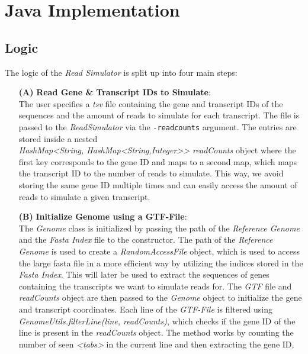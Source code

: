 \documentclass[12pt]{article}
\begin{document}

\section{Java Implementation}
\subsection{Logic}\label{sec:logic}
The logic of the \textit{Read Simulator} is split up into four main steps:
\begin{enumerate}
	\item[\textbf{(A)}] \textbf{Read Gene \& Transcript IDs to Simulate}:\\
		The user specifies a \textit{tsv} file containing the gene and transcript IDs of the sequences and the
		amount of reads to simulate for each transcript. The file is passed to the \textit{ReadSimulator}
		via the \texttt{-readcounts} argument. The entries are stored inside a nested \\
		\textit{HashMap<String, HashMap<String,Integer>\hspace{0.1mm}> readCounts} object where
		the first key corresponds to the gene ID and maps to a second map, which maps the transcript ID to the number of reads to simulate.
		This way, we avoid storing the same gene ID multiple times and can easily access the amount of reads to simulate a given transcript.
	\item[\textbf{(B)}] \textbf{Initialize Genome using a GTF-File}:\\
		The \textit{Genome} class is initialized by passing the path of the \textit{Reference Genome} and the \textit{Fasta Index} file to the constructor.
		The path of the \textit{Reference Genome} is used to create a \textit{RandomAccessFile} object, which is used to
		access the large fasta file in a more efficient way by utilizing the indices stored in the \textit{Fasta Index}.
		This will later be used to extract the sequences of genes containing the transcripts we want to simulate reads for.
		The \textit{GTF} file and \textit{readCounts} object are then passed to the \textit{Genome} object to initialize the gene and transcript coordinates.
		Each line of the \textit{GTF-File} is filtered using \textit{GenomeUtils.filterLine(line, readCounts)}, which
		 checks if the gene ID of the line is present in the \textit{readCounts} object.
		The method works by counting the number of seen \textit{<tabs>} in the current line and then extracting the gene ID,

\end{enumerate}
\end{document}
